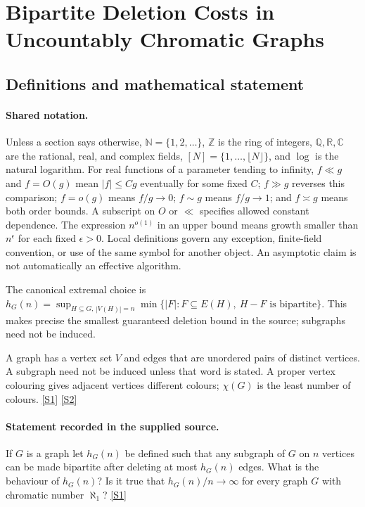 \documentclass[11pt,a4paper]{article}
\newcommand{\N}{\mathbb{N}}
\newcommand{\Z}{\mathbb{Z}}
\newcommand{\Q}{\mathbb{Q}}
\newcommand{\R}{\mathbb{R}}
\newcommand{\C}{\mathbb{C}}
\newcommand{\sref}[2]{\hyperlink{source:#1:#2}{[S#2]}}
\begin{document}
\section{Bipartite Deletion Costs in Uncountably Chromatic Graphs}\label{statement}


\subsection{Definitions and mathematical statement}

\paragraph{Shared notation.}Unless a section says otherwise, $\N=\{1,2,\ldots\}$,
$\Z$ is the ring of integers, $\Q,\R,\C$ are the rational, real, and complex
fields, $[N]=\{1,\ldots,\lfloor N\rfloor\}$, and $\log$ is the natural
logarithm. For real functions of a parameter tending to infinity,
$f\ll g$ and $f=O(g)$ mean $|f|\leq Cg$ eventually for some fixed $C$;
$f\gg g$ reverses this comparison; $f=o(g)$ means $f/g\to0$;
$f\sim g$ means $f/g\to1$; and $f\asymp g$ means both order bounds.
A subscript on $O$ or $\ll$ specifies allowed constant dependence.
The expression $n^{o(1)}$ in an upper bound means growth smaller than
$n^\epsilon$ for each fixed $\epsilon>0$. Local definitions govern any
exception, finite-field convention, or use of the same symbol for another
object. An asymptotic claim is not automatically an effective algorithm.



The canonical extremal choice is $h_G(n)=\sup_{H\subseteq G,\,|V(H)|=n}\min\{|F|:F\subseteq E(H),\ H-F\text{ is bipartite}\}$. This makes precise the smallest guaranteed deletion bound in the source; subgraphs need not be induced.

A graph has a vertex set $V$ and edges that are unordered pairs of distinct vertices. A subgraph need not be induced unless that word is stated. A proper vertex colouring gives adjacent vertices different colours; $\chi(G)$ is the least number of colours. \sref{statement}{1} \sref{statement}{2}

\paragraph{Statement recorded in the supplied source.}
If $G$ is a graph let $h_G(n)$ be defined such that any subgraph of $G$ on $n$ vertices can be made bipartite after deleting at most $h_G(n)$ edges.
What is the behaviour of $h_G(n)$? Is it true that $h_G(n)/n\to \infty$ for every graph $G$ with chromatic number $\aleph_1$? \sref{statement}{1}
\end{document}
